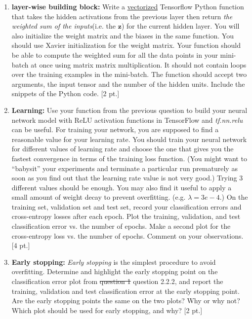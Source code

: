 \documentclass[12pt,letterpaper]{article}
\begin{document}
\begin{enumerate}
  \item  \textbf{layer-wise building block:} Write a \underline{vectorized} Tensorflow Python function that takes the hidden activations from the previous layer then return \textit{the weighted sum of the inputs}(i.e. the $\mathbf{z}$) for the current hidden layer. You will also initialize the weight matrix and the biases in the same function. You should use Xavier initialization for the weight matrix. Your function should be able to compute the weighted sum for all the data points in your mini-batch at once using matrix matrix multiplication. It should not contain loops over the training examples in the mini-batch. The function should accept two arguments, the input tensor and the number of the hidden units. Include the snippets of the Python code. [2 pt.]
  \item  \textbf{Learning:} Use your function from the previous question to build your neural network model with ReLU activation functions in TensorFlow and \textit{tf.nn.relu} can be useful. For training your network, you are supposed to find a reasonable value for your learning rate. You should train your neural network for different values of learning rate and choose the one that gives you the fastest convergence in terms of the training loss function. (You might want to ``babysit'' your experiments and terminate a particular run prematurely as soon as you find out that the learning rate value is not very good.) Trying 3 different values should be enough. You may also find it useful to apply a small amount of weight decay to prevent overfitting. (e.g. $\lambda = 3e-4$.) On the training set, validation set and test set, record your classification errors and cross-entropy losses after each epoch. Plot the training, validation, and test classification error vs. the number of epochs. Make a second plot for the cross-entropy loss vs. the number of epochs. Comment on your observations. [4 pt.]
  \item \textbf{Early stopping:} \textit{Early stopping} is the simplest procedure to avoid overfitting. Determine and highlight the early stopping point on the classification error plot from \st{question 1} {\color{red} question 2.2.2}, and report the training, validation and test classification error at the early stopping point. Are the early stopping points the same on the two plots? Why or why not? Which plot should be used for early stopping, and why? [2 pt.]
\end{enumerate}
\end{document}
